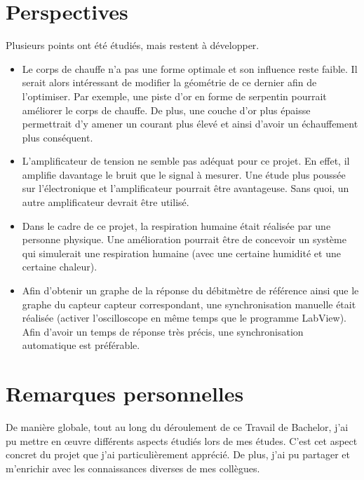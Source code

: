 \section{Perspectives}
Plusieurs points ont été étudiés, mais restent à développer. 
\begin{itemize}
    \item Le corps de chauffe n'a pas une forme optimale et son influence reste faible. Il serait alors intéressant de modifier la géométrie de ce
          dernier afin de l'optimiser. Par exemple, une piste d'or en forme de serpentin pourrait améliorer le corps de chauffe.  De plus, une 
          couche d'or plus épaisse permettrait d'y amener un courant plus élevé et ainsi d'avoir un échauffement plus conséquent. \\
    \item L'amplificateur de tension ne semble pas adéquat pour ce projet. En effet, il amplifie davantage le bruit que le signal à mesurer. Une
          étude plus poussée sur l'électronique et l'amplificateur pourrait être avantageuse. Sans quoi, un autre amplificateur devrait être utilisé. \\
    \item Dans le cadre de ce projet, la respiration humaine était réalisée par une personne physique. Une amélioration pourrait être de concevoir
          un système qui simulerait une respiration humaine (avec une certaine humidité et une certaine chaleur). \\
    \item Afin d'obtenir un graphe de la réponse du débitmètre de référence ainsi que le graphe du capteur \gls{capteur} correspondant, une
          synchronisation manuelle était réalisée (activer l'oscilloscope en même temps que le programme LabView). Afin d'avoir un temps de réponse très 
          précis, une synchronisation automatique est préférable. 
\end{itemize}

\section{Remarques personnelles}
De manière globale, tout au long du déroulement de ce Travail de Bachelor, j'ai pu mettre en \oe uvre différents aspects étudiés lors de mes études. C'est cet 
aspect concret du projet que j'ai particulièrement apprécié. De plus, j'ai pu partager et m'enrichir avec les connaissances diverses de mes 
collègues. \\

